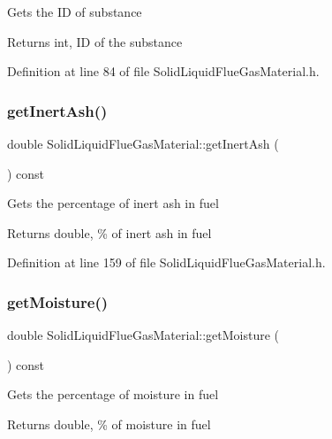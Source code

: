 Gets the ID of substance \begin{DoxyReturn}{Returns}
int, ID of the substance 
\end{DoxyReturn}


Definition at line 84 of file Solid\+Liquid\+Flue\+Gas\+Material.\+h.

\mbox{\label{class_solid_liquid_flue_gas_material_a0549b32b7b5423267d5f59cc96b98127}} 
\subsubsection{\texorpdfstring{get\+Inert\+Ash()}{getInertAsh()}}
{\footnotesize\ttfamily double Solid\+Liquid\+Flue\+Gas\+Material\+::get\+Inert\+Ash (\begin{DoxyParamCaption}{ }\end{DoxyParamCaption}) const\hspace{0.3cm}{\ttfamily [inline]}}

Gets the percentage of inert ash in fuel \begin{DoxyReturn}{Returns}
double, \% of inert ash in fuel 
\end{DoxyReturn}


Definition at line 159 of file Solid\+Liquid\+Flue\+Gas\+Material.\+h.

\mbox{\label{class_solid_liquid_flue_gas_material_accf3c8be942d0ba244f6eabab6e7012b}} 
\subsubsection{\texorpdfstring{get\+Moisture()}{getMoisture()}}
{\footnotesize\ttfamily double Solid\+Liquid\+Flue\+Gas\+Material\+::get\+Moisture (\begin{DoxyParamCaption}{ }\end{DoxyParamCaption}) const\hspace{0.3cm}{\ttfamily [inline]}}

Gets the percentage of moisture in fuel \begin{DoxyReturn}{Returns}
double, \% of moisture in fuel 
\end{DoxyReturn}


